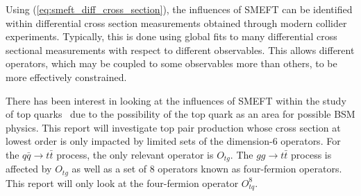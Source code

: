 \documentclass[a4paper,11pt]{article}
\begin{document}
Using (\ref{eq:smeft_diff_cross_section}), the influences of SMEFT can be identified within differential cross section measurements obtained through modern collider experiments.
Typically, this is done using global fits to many differential cross sectional measurements with respect to different observables.
This allows different operators, which may be coupled to some observables more than others, to be more effectively constrained.

There has been interest in looking at the influences of SMEFT within the study of top quarks~\cite{Hartland_2019,Buckley_2015,Brivio_2020} due to the possibility of the top quark as an area for possible BSM physics.
This report will investigate top pair production whose cross section at lowest order is only impacted by limited sets of the dimension-6 operators. For the $q\bar{q} \rightarrow t\bar{t}$ process, the only relevant operator is $O_{tg}$.
The $gg \rightarrow t\bar{t}$ process is affected by $O_{tg}$ as well as a set of 8 operators known as four-fermion operators.
This report will only look at the four-fermion operator $O_{tq}^{8}$.

\end{document}
